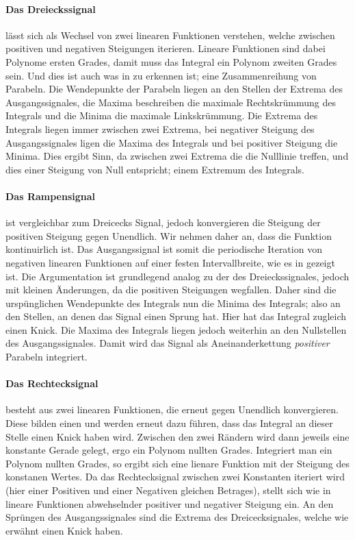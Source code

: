 \paragraph{Das Dreieckssignal} lässt sich als Wechsel von zwei linearen Funktionen verstehen, welche zwischen positiven und negativen Steigungen iterieren. Lineare Funktionen sind dabei Polynome ersten Grades, damit muss das Integral ein Polynom zweiten Grades sein. Und dies ist auch was in  zu erkennen ist; eine Zusammenreihung von Parabeln. 
Die Wendepunkte der Parabeln liegen an den Stellen der Extrema des Ausgangssignales, die Maxima beschreiben die maximale Rechtskrümmung des Integrals und die Minima die maximale Linkskrümmung. 
Die Extrema des Integrals liegen immer zwischen zwei Extrema, bei negativer Steigung des Ausgangssignales ligen die Maxima des Integrals und bei positiver Steigung die Minima. Dies ergibt Sinn, da zwischen zwei Extrema die die Nulllinie treffen, und dies einer Steigung von Null entspricht; einem Extremum des Integrals.

\paragraph{Das Rampensignal} ist vergleichbar zum Dreicecks Signal, jedoch konvergieren die Steigung der positiven Steigung gegen Unendlich. Wir nehmen daher an, dass die Funktion kontinuirlich ist. Das Ausgangssignal ist somit die periodische Iteration von negativen linearen Funktionen auf einer festen Intervallbreite, wie es in  gezeigt ist.
Die Argumentation ist grundlegend analog zu der des Dreieckssignales, jedoch mit kleinen Änderungen, da die positiven Steigungen wegfallen. Daher sind die urspünglichen Wendepunkte des Integrals nun die Minima des Integrals; also an den Stellen, an denen das Signal einen Sprung hat. Hier hat das Integral zugleich einen Knick. Die Maxima des Integrals liegen jedoch weiterhin an den Nullstellen des Ausgangssignales. Damit wird das Signal als Aneinanderkettung \emph{positiver} Parabeln integriert.

\paragraph{Das Rechtecksignal} besteht aus zwei linearen Funktionen, die erneut gegen Unendlich konvergieren. Diese bilden einen und werden erneut dazu führen, dass das Integral an dieser Stelle einen Knick haben wird. Zwischen den zwei Rändern wird dann jeweils eine konstante Gerade gelegt, ergo ein Polynom nullten Grades. Integriert man ein Polynom nullten Grades, so ergibt sich eine lienare Funktion mit der Steigung des konstanen Wertes. Da das Rechtecksignal zwischen zwei Konstanten iteriert wird (hier einer Positiven und einer Negativen gleichen Betrages), stellt sich wie in  lineare Funktionen abwehselnder positiver und negativer Steigung ein.
An den Sprüngen des Ausgangssignales sind die Extrema des Dreicecksignales, welche wie erwähnt einen Knick haben.

